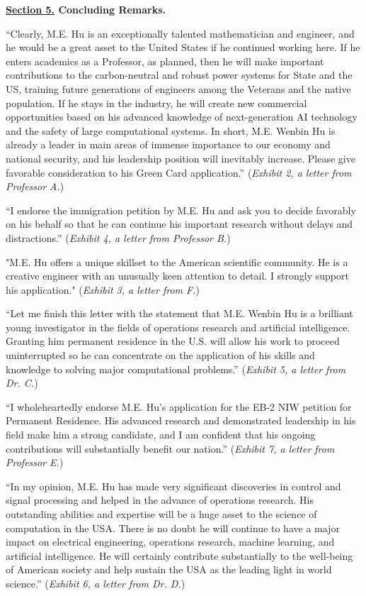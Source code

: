 \documentclass{article}
\begin{document}
{\bf \underline{Section 5.} Concluding Remarks. }

“Clearly, M.E. Hu is an exceptionally talented mathematician and engineer, and he would be a great asset to the United States if he continued working here. If he enters academics as a Professor, as planned, then he will make important contributions to the carbon-neutral and robust power systems for State and the US, training future generations of engineers among the Veterans and the native population. If he stays in the industry, he will create new commercial opportunities based on his advanced knowledge of next-generation AI technology and the safety of large computational systems. In short, M.E. Wenbin Hu is already a leader in main areas of immense importance to our economy and national security, and his leadership position will inevitably increase. Please give favorable consideration to his Green Card application.” ({\it Exhibit 2, a letter from Professor A.}) 

“I endorse the immigration petition by M.E. Hu and ask you to decide favorably on his behalf so that he can continue his important research without delays and distractions.” ({\it Exhibit 4, a letter from Professor B.}) 

"M.E. Hu offers a unique skillset to the American scientific community. He is a creative engineer with an unusually keen attention to detail. I strongly support his application." ({\it Exhibit 3, a letter from F.}) 

“Let me finish this letter with the statement that M.E. Wenbin Hu is a brilliant young investigator in the fields of operations research and artificial intelligence. Granting him permanent residence in the U.S. will allow his work to proceed uninterrupted so he can concentrate on the application of his skills and knowledge to solving major computational problems.” ({\it Exhibit 5, a letter from Dr. C.}) 

“I wholeheartedly endorse M.E. Hu's application for the EB-2 NIW petition for Permanent Residence. His advanced research and demonstrated leadership in his field make him a strong candidate, and I am confident that his ongoing contributions will substantially benefit our nation.” ({\it Exhibit 7, a letter from Professor E.}) 

“In my opinion, M.E. Hu has made very significant discoveries in control and signal processing and helped in the advance of operations research. His outstanding abilities and expertise will be a huge asset to the science of computation in the USA. There is no doubt he will continue to have a major impact on electrical engineering, operations research, machine learning, and artificial intelligence. He will certainly contribute substantially to the well-being of American society and help sustain the USA as the leading light in world science.” ({\it Exhibit 6, a letter from Dr. D.}) 
\end{document}
